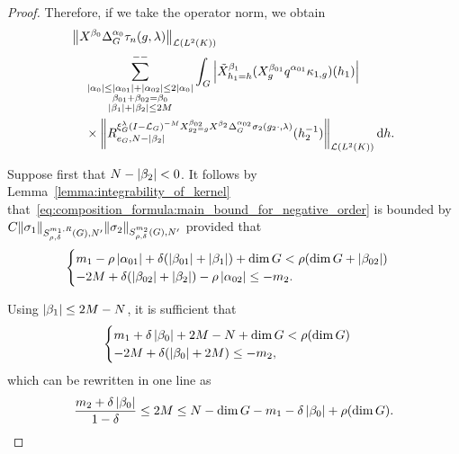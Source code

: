 \begin{proof}
    Therefore,
    if we take the operator norm,
    we obtain
    \begin{align}
        &\norm [\Lin {\Lebesgue 2 \CompactGroup}] {\LeftDifferentialOperator {\beta_0} \DifferenceOperatorOrder {\alpha_0} \tau_n(g, \lambda)} \notag\\
        &\quad \lcsum{%
            \substack{%
                \abs{\alpha_0} \leq \abs{\alpha_{01}} + \abs{\alpha_{02}} \leq 2 \abs{\alpha_0}\\
                \beta_{01} + \beta_{02} = \beta_0\\
                \abs {\beta_1} + \abs {\beta_2} \leq 2 M
            }
        }
        \int_\Group \abs {\RightDifferentialOperator[h_1 = h] {\beta_1} (\LeftDifferentialOperator [g] {\beta_{01}} q^{\alpha_{01}} \kappa_{1, g})(h_1)} \notag\\
        &\quad \times
        \norm [\Lin {\Lebesgue 2 \CompactGroup}] {%
            \TaylorRemainder {\Rep \lambda \BesselPotentialSquared {-M} \LeftDifferentialOperator [g_2 = g] {\beta_{02}} \LeftDifferentialOperator {\beta_2} \DifferenceOperatorOrder {\alpha_{02}} \sigma_2(g_2 \dummy, \lambda)} {e_\Group} {N - \abs {\beta_2}} (h_2^{-1})
        } \dd h.
        \label{eq:composition_formula:main_bound_for_negative_order}
    \end{align}

    Suppose first that $N - \abs {\beta_2} < 0$.
    It follows by Lemma~\ref{lemma:integrability_of_kernel}
    that~\eqref{eq:composition_formula:main_bound_for_negative_order} is bounded by $C \SymbolSemiNorm {m_1, R} {\rho, \delta} {N'} {\sigma_1} \SymbolSemiNorm {m_2} {\rho, \delta} {N'} {\sigma_2}$
    provided that
    \begin{align*}
        \begin{cases}
            m_1 - \rho \abs {\alpha_{01}} + \delta (\abs {\beta_{01}} + \abs {\beta_1}) + \dim \Group < \rho(\dim \Group + \abs {\beta_{02}})\\
            -2 M + \delta(\abs {\beta_{02}} + \abs {\beta_2}) - \rho \abs {\alpha_{02}} \leq - m_2.
        \end{cases}
    \end{align*}

    Using $\abs {\beta_1} \leq 2M - N$,
    it is sufficient that
    \begin{align*}
        \begin{cases}
            m_1 + \delta \abs {\beta_{0}} + 2 M - N + \dim \Group < \rho(\dim \Group)\\
            -2 M + \delta(\abs {\beta_{0}} + 2 M) \leq - m_2,
        \end{cases}
    \end{align*}
    which can be rewritten in one line as
    \begin{align}
        \frac {m_2 + \delta \abs {\beta_{0}}} {1 - \delta} \leq 2 M
        \leq N - \dim \Group - m_1 - \delta \abs {\beta_0} + \rho (\dim \Group).
        \label{eq:composition_formula:first_condition_on_M}
    \end{align}


\end{proof}
